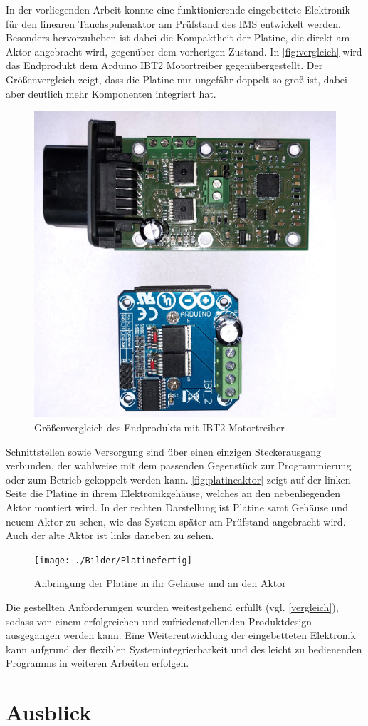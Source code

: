 In der vorliegenden Arbeit konnte eine funktionierende eingebettete Elektronik für den linearen Tauchspulenaktor am Prüfstand des IMS entwickelt werden. Besonders hervorzuheben ist dabei die Kompaktheit der Platine, die direkt am Aktor angebracht wird, gegenüber dem vorherigen Zustand. In \autoref{fig:vergleich} wird das Endprodukt dem Arduino IBT2 Motortreiber gegenübergestellt. Der Größenvergleich zeigt, dass die Platine nur ungefähr doppelt so groß ist, dabei aber deutlich mehr Komponenten integriert hat.
\begin{figure}[H]%
\centering
\includegraphics[width=0.35\columnwidth]{./Bilder/VergleichPlatine}%
\caption{Größenvergleich des Endprodukts mit IBT2 Motortreiber}%
\label{fig:vergleich}%
\end{figure}
Schnittstellen sowie Versorgung sind über einen einzigen Steckerausgang verbunden, der wahlweise mit dem passenden Gegenstück zur Programmierung oder zum Betrieb gekoppelt werden kann. 
\autoref{fig:platineaktor} zeigt auf der linken Seite die Platine in ihrem Elektronikgehäuse, welches an den nebenliegenden Aktor montiert wird. In der rechten Darstellung ist Platine samt Gehäuse und neuem Aktor zu sehen, wie das System später am Prüfstand angebracht wird. Auch der alte Aktor ist links daneben zu sehen.
\begin{figure}[H]
\centering
\texttt{[image: ./Bilder/Platinefertig]}
\caption{Anbringung der Platine in ihr Gehäuse und an den Aktor}
\label{fig:platineaktor}
\end{figure}
Die gestellten Anforderungen wurden weitestgehend erfüllt (vgl. \autoref{vergleich}), sodass von einem erfolgreichen und zufriedenstellenden Produktdesign ausgegangen werden kann. Eine Weiterentwicklung der eingebetteten Elektronik kann aufgrund der flexiblen Systemintegrierbarkeit und des leicht zu bedienenden Programms in weiteren Arbeiten erfolgen. 

\section{Ausblick} 

